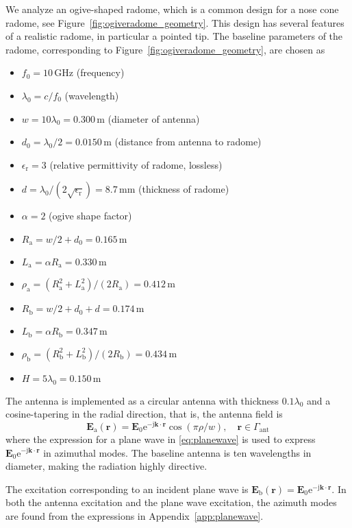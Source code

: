 \documentclass[a4paper,12pt]{article}
\renewcommand{\vec}[1]{\boldsymbol{#1}}
\newcommand{\mrm}[1]{\mathrm{#1}}
\newcommand{\unit}[1]{\ensuremath{\,\mrm{#1}}}
\newcommand{\ju}{\mrm{j}}
\newcommand{\eu}{\mrm{e}}
\newcommand{\cu}{c}
\newcommand{\Ev}{\vec{E}}
\newcommand{\rv}{\vec{r}}
\newcommand{\kv}{\vec{k}}
\begin{document}
We analyze an ogive-shaped radome, which is a common design for a nose
cone radome, see Figure~\ref{fig:ogiveradome_geometry}. This design
has several features of a realistic radome, in particular a pointed
tip. The baseline parameters of the radome, corresponding to
Figure~\ref{fig:ogiveradome_geometry}, are chosen as
\begin{itemize}
\item $f_{0} = 10\unit{GHz}$ (frequency)
\item $\lambda_{0} = \cu/f_{0}$ (wavelength)
\item $w = 10\lambda_{0} = 0.300\unit{m}$ (diameter of antenna)
\item $d_{0} = \lambda_{0}/2 = 0.0150\unit{m}$ (distance from antenna to radome)
\item $\epsilon_{\mrm{r}} = 3$ (relative permittivity of radome, lossless)
\item $d = \lambda_{0}/(2\sqrt{\epsilon_{\mrm{r}}}) = 8.7\unit{mm}$
  (thickness of radome)
\item $\alpha = 2$ (ogive shape factor)
\item $R_{\mrm{a}} = w/2 + d_{0} = 0.165\unit{m}$
\item $L_{\mrm{a}} = \alpha R_{\mrm{a}} = 0.330\unit{m}$
\item $\rho_{\mrm{a}} = (R_{\mrm{a}}^{2} + L_{\mrm{a}}^{2})/(2R_{\mrm{a}}) = 0.412\unit{m}$
\item $R_{\mrm{b}} = w/2 + d_{0} + d = 0.174\unit{m}$
\item $L_{\mrm{b}} = \alpha R_{\mrm{b}} = 0.347\unit{m}$
\item $\rho_{\mrm{b}} = (R_{\mrm{b}}^{2} + L_{\mrm{b}}^{2})/(2R_{\mrm{b}}) = 0.434\unit{m}$
\item $H = 5\lambda_{0} = 0.150\unit{m}$
\end{itemize}
The antenna is implemented as a circular antenna with thickness
$0.1\lambda_{0}$ and a cosine-tapering in the radial direction, that
is, the antenna field is
\begin{equation}
  \Ev_{\mrm{a}}(\rv) = \Ev_{0}\eu^{-\ju\kv\cdot\rv}\cos(\pi\rho/w), \quad \rv\in\Gamma_{\mrm{ant}}
\end{equation}
where the expression for a plane wave in \eqref{eq:planewave} is used
to express $\Ev_{0}\eu^{-\ju\kv\cdot\rv}$ in azimuthal modes. The
baseline antenna is ten wavelengths in diameter, making the radiation
highly directive.

The excitation corresponding to an incident plane wave is
$\Ev_{\mrm{b}}(\rv) = \Ev_{0}\eu^{-\ju\kv\cdot\rv}$. In both the antenna
excitation and the plane wave excitation, the azimuth modes are found
from the expressions in Appendix~\ref{app:planewave}.
\end{document}
